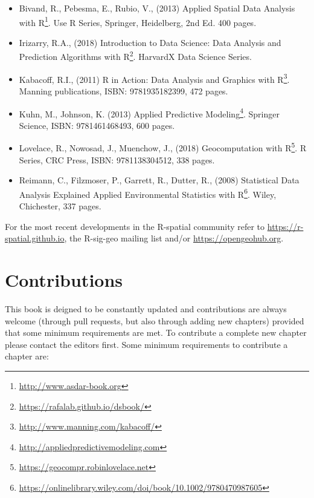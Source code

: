 \documentclass[graybox,natbib,nospthms,UStrade]{svmono}
\renewcommand{\href}[2]{#2 (\url{#1})}
\renewcommand{\href}[2]{#2\footnote{\url{#1}}}
\begin{document}
\begin{itemize}
\item
  Bivand, R., Pebesma, E., Rubio, V., (2013) \href{http://www.asdar-book.org}{Applied Spatial Data Analysis with R}. Use R Series, Springer, Heidelberg, 2nd Ed. 400 pages.
\item
  Irizarry, R.A., (2018) \href{https://rafalab.github.io/dsbook/}{Introduction to Data Science: Data Analysis and Prediction Algorithms with R}. HarvardX Data Science Series.
\item
  Kabacoff, R.I., (2011) \href{http://www.manning.com/kabacoff/}{R in Action: Data Analysis and Graphics with R}. Manning publications, ISBN: 9781935182399, 472 pages.
\item
  Kuhn, M., Johnson, K. (2013) \href{http://appliedpredictivemodeling.com}{Applied Predictive Modeling}. Springer Science, ISBN: 9781461468493, 600 pages.
\item
  Lovelace, R., Nowosad, J., Muenchow, J., (2018) \href{https://geocompr.robinlovelace.net}{Geocomputation with R}. R Series, CRC Press, ISBN: 9781138304512, 338 pages.
\item
  Reimann, C., Filzmoser, P., Garrett, R., Dutter, R., (2008) \href{https://onlinelibrary.wiley.com/doi/book/10.1002/9780470987605}{Statistical Data Analysis Explained Applied Environmental Statistics with R}. Wiley, Chichester, 337 pages.
\end{itemize}

For the most recent developments in the R-spatial community refer to \url{https://r-spatial.github.io}, the R-sig-geo mailing list and/or \url{https://opengeohub.org}.

\hypertarget{contributions}{%
\section*{Contributions}\label{contributions}}

This book is deigned to be constantly updated and contributions are always welcome (through pull requests, but also through adding new chapters) provided that some minimum requirements are met. To contribute a complete new chapter please contact the editors first. Some minimum requirements to contribute a chapter are:
\end{document}
